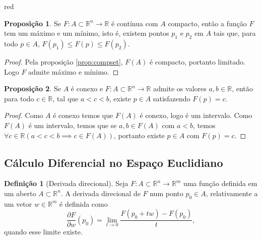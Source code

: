 \documentclass[12pt,leqno,twoside]{amsart}
\theoremstyle{definition}
\newtheorem{proposicao}{Proposição}[section]
\newtheorem{definicao}{Definição}[section]
\begin{document}
\begin{color}{red}
\begin{proposicao}
	Se $F:A\subset \mathbb{R}^n \to \mathbb{R}$ é contínua com $A$ compacto, então a função $F$ tem um máximo e um mínimo, isto é, existem pontos $p_1$ e $p_2$ em $A$ tais que, para todo $p\in A$, $F(p_1) \leq F(p) \leq F(p_2)$.
\end{proposicao}

\begin{proof}
	Pela proposição \ref{prop:compset}, $F(A)$ é compacto, portanto limitado. Logo $F$ admite máximo e mínimo.
\end{proof}

\vspace{0.3cm}

\begin{proposicao}
	Se $A$ é conexo e  $F:A\subset \mathbb{R}^n \to \mathbb{R}$ admite os valores $a,b \in \mathbb{R}$, então para todo $c\in \mathbb{R}$, tal que $a<c<b$, existe $p\in A$ satisfazendo $F(p) = c$.
\end{proposicao}
\begin{proof}
	Como $A$ é conexo temos que $F(A)$ é conexo, logo é um intervalo. Como $F(A)$ é um intervalo, temos que se $a,b\in F(A)$ com $a<b$, temos $\forall c\in \mathbb{R} ( a<c<b \implies c \in F(A))$, portanto existe $p\in A$ com $F(p) = c$.
\end{proof}

\vspace{0.3cm}

\subsection{Cálculo Diferencial no Espaço Euclidiano}

\vspace{0.3cm}

\begin{definicao}[Derivada direcional]
	Seja $F:A \subset \mathbb{R}^n \to \mathbb{R}^m$ uma função definida em um aberto $A\subset\mathbb{R}^n$. A derivada direcional de $F$ num ponto $p_0\in A$, relativamente a um vetor $ w \in \mathbb{R}^m$ é definida como $$ \dfrac{\partial F}{\partial w} (p_0) = \lim_{t \to 0} \dfrac{F(p_0+tw)-F(p_0)}{t},$$ quando esse limite existe.
\end{definicao}

\vspace{0.3cm}


\end{color}
\end{document}
